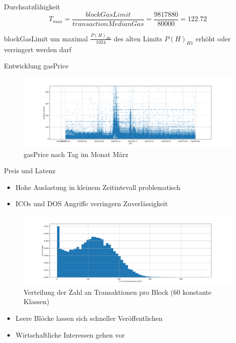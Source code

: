 \documentclass{f4_beamer}
\begin{document}
\begin{frame}{Durchsatzfähigkeit}
$$
  T_{max} = \frac{\textit{blockGasLimit}}{\textit{transactionMedianGas}} = \frac{9817880}{80000} = 122.72
$$
\end{frame}

\begin{frame}{blockGasLimit}
um maximal $ \frac{P(H)_{H1}}{1024} $ des alten Limits  $ P(H)_{H1} $ erhöht oder verringert werden darf
\end{frame}


\begin{frame}{Entwicklung gasPrice}
\begin{figure}[h!]
  \centerline{\includegraphics[width=\textwidth, keepaspectratio]{transactions_gasprice_timeseries.png}}
  \caption{gasPrice nach Tag im Monat März \cite{neemann_appendix_nodate}}
  \label{transactions_gasprice_timeseries}
\end{figure}
\end{frame}

\begin{frame}{Preis und Latenz}
  \begin{itemize}
  \item Hohe Auslastung in kleinem Zeitintevall problematisch
  \item ICOs und DOS Angriffe verringern Zuverlässigkeit 
\end{itemize}
\end{frame}

\begin{frame}{}
  \begin{figure}[h!]
    \centerline{\includegraphics[width=\textwidth, keepaspectratio]{blocks_transactions_per_block.png}}
    \caption{Verteilung der Zahl an Transaktionen pro Block (60 konstante Klassen) \cite{neemann_appendix_nodate}}
    \label{blocks_transactions_per_block}
  \end{figure}
  \begin{itemize}
    \item Leere Blöcke lassen sich schneller Veröffentlichen
    \item Wirtschaftliche Interessen gehen vor 
  \end{itemize}
\end{frame}
\end{document}
